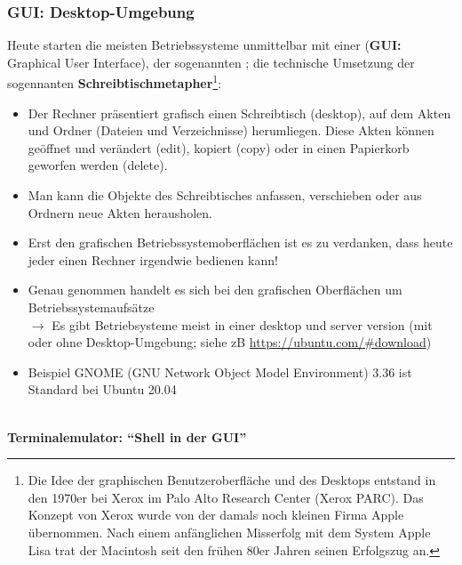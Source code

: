 \subsubsection*{GUI: Desktop-Umgebung}
Heute starten die meisten Betriebssysteme unmittelbar mit einer  (\textbf{GUI:} Graphical User Interface), der sogenannten ; die technische Umsetzung der sogennanten \textbf{Schreibtischmetapher}\footnote{Die Idee der graphischen Benutzeroberfläche und des Desktops entstand in den 1970er bei Xerox im Palo Alto Research Center (Xerox PARC). Das Konzept von Xerox wurde von der damals noch kleinen Firma Apple übernommen. Nach einem anfänglichen Misserfolg mit dem System Apple Lisa trat der Macintosh seit den frühen 80er Jahren seinen Erfolgszug an.}:
\begin{itemize}
	\item Der Rechner präsentiert grafisch einen Schreibtisch (desktop), auf dem Akten und Ordner (Dateien und Verzeichnisse) herumliegen. Diese Akten können geöffnet und verändert (edit), kopiert (copy) oder in einen Papierkorb geworfen werden (delete).
	\item Man kann die Objekte des Schreibtisches anfassen, verschieben oder aus Ordnern neue Akten herausholen.
\end{itemize}
\begin{itemize}
	\item Erst den grafischen Betriebssystemoberflächen ist es zu verdanken, dass heute
	jeder einen Rechner irgendwie bedienen kann!%
	\item 	Genau genommen handelt es sich bei den grafischen Oberflächen um Betriebssystemaufsätze\\
	$\to$ Es gibt Betriebsysteme meist in einer desktop und server version (mit oder ohne Desktop-Umgebung; siehe zB \url{https://ubuntu.com/\#download})
	\item Beispiel GNOME (GNU Network Object Model Environment) 3.36 ist Standard bei Ubuntu 20.04
\end{itemize}
%
~\\
\textbf{Terminalemulator: ``Shell in der GUI''}\\
